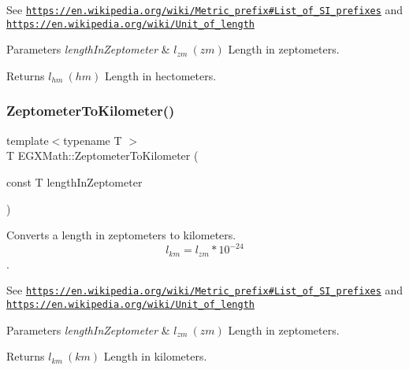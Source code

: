 See \href{https://en.wikipedia.org/wiki/Metric_prefix#List_of_SI_prefixes}{\tt https\+://en.\+wikipedia.\+org/wiki/\+Metric\+\_\+prefix\#\+List\+\_\+of\+\_\+\+S\+I\+\_\+prefixes} and \href{https://en.wikipedia.org/wiki/Unit_of_length}{\tt https\+://en.\+wikipedia.\+org/wiki/\+Unit\+\_\+of\+\_\+length} 
\begin{DoxyParams}{Parameters}
{\em length\+In\+Zeptometer} & $ l_{zm}\ (zm)$ Length in zeptometers. \\
\hline
\end{DoxyParams}
\begin{DoxyReturn}{Returns}
$ l_{hm}\ (hm)$ Length in hectometers. 
\end{DoxyReturn}
\mbox{\label{group___e_g_x_math-_conversions-_length_conversions-_zeptometer-_s_i_ga687dc5d33c63561c87a06568fd928da9}} 
\subsubsection{\texorpdfstring{Zeptometer\+To\+Kilometer()}{ZeptometerToKilometer()}}
{\footnotesize\ttfamily template$<$typename T $>$ \\
T E\+G\+X\+Math\+::\+Zeptometer\+To\+Kilometer (\begin{DoxyParamCaption}\item[{const T}]{length\+In\+Zeptometer }\end{DoxyParamCaption})}



Converts a length in zeptometers to kilometers. \[ l_{km}=l_{zm} * 10^{-24} \]. 

See \href{https://en.wikipedia.org/wiki/Metric_prefix#List_of_SI_prefixes}{\tt https\+://en.\+wikipedia.\+org/wiki/\+Metric\+\_\+prefix\#\+List\+\_\+of\+\_\+\+S\+I\+\_\+prefixes} and \href{https://en.wikipedia.org/wiki/Unit_of_length}{\tt https\+://en.\+wikipedia.\+org/wiki/\+Unit\+\_\+of\+\_\+length} 
\begin{DoxyParams}{Parameters}
{\em length\+In\+Zeptometer} & $ l_{zm}\ (zm)$ Length in zeptometers. \\
\hline
\end{DoxyParams}
\begin{DoxyReturn}{Returns}
$ l_{km}\ (km)$ Length in kilometers. 
\end{DoxyReturn}
\mbox{\label{group___e_g_x_math-_conversions-_length_conversions-_zeptometer-_s_i_ga53c621beeed03e51c3ad8a5cc267a35f}} 
